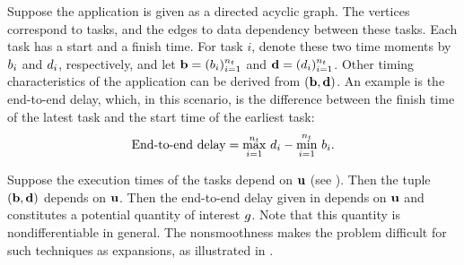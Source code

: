 Suppose the application is given as a directed acyclic graph. The vertices
correspond to tasks, and the edges to data dependency between these tasks. Each
task has a start and a finish time. For task $i$, denote these two time moments
by $b_i$ and $d_i$, respectively, and let $\mathbf{b} = (b_i)_{i=1}^{n_t}$ and $\mathbf{d} =
(d_i)_{i=1}^{n_t}$. Other timing characteristics of the application can be
derived from $(\mathbf{b}, \mathbf{d})$. An example is the end-to-end delay, which, in this
scenario, is the difference between the finish time of the latest task and the
start time of the earliest task:
\begin{equation} \elab{end-to-end-delay}
  \text{End-to-end delay} = \max_{i = 1}^\nt \, \d_i - \min_{i = 1}^\nt \, \b_i.
\end{equation}

Suppose the execution times of the tasks depend on $\mathbf{u}$ (see ).
Then the tuple $(\mathbf{b}, \mathbf{d})$ depends on $\mathbf{u}$. Then the end-to-end delay given in
 depends on $\mathbf{u}$ and constitutes a potential quantity of
interest $g$. Note that this quantity is nondifferentiable in general. The
nonsmoothness makes the problem difficult for such techniques as 
expansions, as illustrated in .
